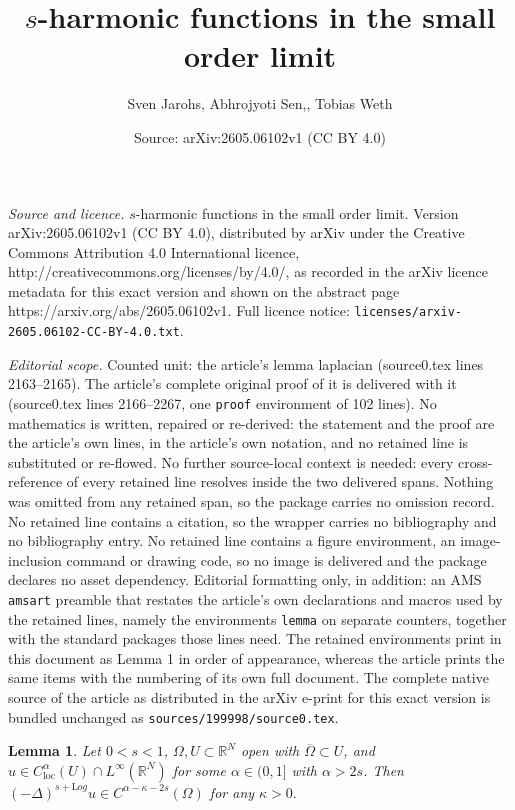 \documentclass[10pt,a4paper]{amsart}
\title{$s$-harmonic functions in the small order limit}
\author{Sven Jarohs, Abhrojyoti Sen,, Tobias Weth}
\date{Source: arXiv:2605.06102v1 (CC BY 4.0)}
\newtheorem{lemma}{Lemma}
\newcommand{\RR}{\mathds{R}}
\newcommand{\loc}{\mathrm{loc}}
\begin{document}
\maketitle

\noindent\emph{Source and licence.} $s$-harmonic functions in the small order limit. Version arXiv:2605.06102v1 (CC BY 4.0), distributed by arXiv under the Creative Commons Attribution 4.0 International licence, http://creativecommons.org/licenses/by/4.0/, as recorded in the arXiv licence metadata for this exact version and shown on the abstract page https://arxiv.org/abs/2605.06102v1. Full licence notice: \texttt{licenses/arxiv-2605.06102-CC-BY-4.0.txt}.\par\smallskip

\noindent\textit{Editorial scope.} Counted unit: the article's lemma laplacian (source0.tex lines 2163--2165). The article's complete original proof of it is delivered with it (source0.tex lines 2166--2267, one \texttt{proof} environment of 102 lines). No mathematics is written, repaired or re-derived: the statement and the proof are the article's own lines, in the article's own notation, and no retained line is substituted or re-flowed.  No further source-local context is needed: every cross-reference of every retained line resolves inside the two delivered spans.  Nothing was omitted from any retained span, so the package carries no omission record.  No retained line contains a citation, so the wrapper carries no bibliography and no bibliography entry.  No retained line contains a figure environment, an image-inclusion command or drawing code, so no image is delivered and the package declares no asset dependency.  Editorial formatting only, in addition: an AMS \texttt{amsart} preamble that restates the article's own declarations and macros used by the retained lines, namely the environments \texttt{lemma} on separate counters, together with the standard packages those lines need.  The retained environments print in this document as Lemma 1 in order of appearance, whereas the article prints the same items with the numbering of its own full document.  The complete native source of the article as distributed in the arXiv e-print for this exact version is bundled unchanged as \texttt{sources/199998/source0.tex}.
\begin{lemma}\label{holder for frac log laplacian}
  Let $0<s<1$, $\Omega,U\subset \RR^N$ open with $\overline{\Omega}\subset U$, and $u \in C^{\alpha}_{\loc}(U)\cap L^{\infty}(\RR^N)$ for some $\alpha\in (0,1]$ with $\alpha>2s$. Then $(-\Delta)^{s+\mathrm Log} u\in C^{\alpha-\kappa -2s}(\Omega)$ for any $\kappa>0.$
\end{lemma}
\end{document}
